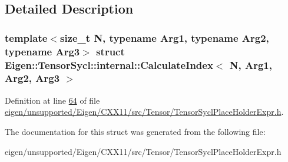 \subsection{Detailed Description}
\subsubsection*{template$<$size\+\_\+t N, typename Arg1, typename Arg2, typename Arg3$>$\newline
struct Eigen\+::\+Tensor\+Sycl\+::internal\+::\+Calculate\+Index$<$ N, Arg1, Arg2, Arg3 $>$}



Definition at line \hyperlink{eigen_2unsupported_2_eigen_2_c_x_x11_2src_2_tensor_2_tensor_sycl_place_holder_expr_8h_source_l00064}{64} of file \hyperlink{eigen_2unsupported_2_eigen_2_c_x_x11_2src_2_tensor_2_tensor_sycl_place_holder_expr_8h_source}{eigen/unsupported/\+Eigen/\+C\+X\+X11/src/\+Tensor/\+Tensor\+Sycl\+Place\+Holder\+Expr.\+h}.



The documentation for this struct was generated from the following file\+:\begin{DoxyCompactItemize}
\item 
eigen/unsupported/\+Eigen/\+C\+X\+X11/src/\+Tensor/\+Tensor\+Sycl\+Place\+Holder\+Expr.\+h\end{DoxyCompactItemize}

